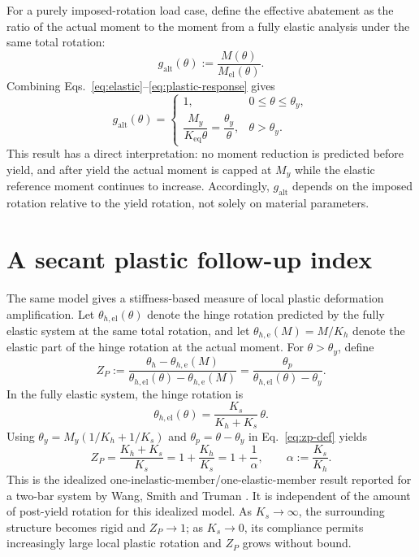 \documentclass[11pt,a4paper]{article}
\begin{document}
For a purely imposed-rotation load case, define the effective abatement as the ratio of the actual moment to the moment from a fully elastic analysis under the same total rotation:
\begin{equation}
g_{\mathrm{alt}}(\theta):=\frac{M(\theta)}{M_{\mathrm{el}}(\theta)}.
\label{eq:g-alt-def}
\end{equation}
Combining Eqs.~\eqref{eq:elastic}--\eqref{eq:plastic-response} gives
\begin{equation}
g_{\mathrm{alt}}(\theta)=
\begin{cases}
1, & 0\leq\theta\leq\theta_y,\\[2mm]
\dfrac{M_y}{K_{\mathrm{eq}}\theta}
=\dfrac{\theta_y}{\theta}, & \theta>\theta_y.
\end{cases}
\label{eq:g-alt}
\end{equation}
This result has a direct interpretation: no moment reduction is predicted before yield, and after yield the actual moment is capped at $M_y$ while the elastic reference moment continues to increase. Accordingly, $g_{\mathrm{alt}}$ depends on the imposed rotation relative to the yield rotation, not solely on material parameters.

\section{A secant plastic follow-up index}

The same model gives a stiffness-based measure of local plastic deformation amplification. Let $\theta_{h,\mathrm{el}}(\theta)$ denote the hinge rotation predicted by the fully elastic system at the same total rotation, and let $\theta_{h,\mathrm{e}}(M)=M/K_h$ denote the elastic part of the hinge rotation at the actual moment. For $\theta>\theta_y$, define
\begin{equation}
Z_P:=
\frac{\theta_h-\theta_{h,\mathrm{e}}(M)}
{\theta_{h,\mathrm{el}}(\theta)-\theta_{h,\mathrm{e}}(M)}
=\frac{\theta_p}
{\theta_{h,\mathrm{el}}(\theta)-\theta_y}.
\label{eq:zp-def}
\end{equation}
In the fully elastic system, the hinge rotation is
\begin{equation}
\theta_{h,\mathrm{el}}(\theta)
=\frac{K_s}{K_h+K_s}\,\theta.
\end{equation}
Using $\theta_y=M_y(1/K_h+1/K_s)$ and $\theta_p=\theta-\theta_y$ in Eq.~\eqref{eq:zp-def} yields
\begin{equation}
Z_P=\frac{K_h+K_s}{K_s}
=1+\frac{K_h}{K_s}
=1+\frac{1}{\alpha},
\qquad \alpha:=\frac{K_s}{K_h}.
\label{eq:zp}
\end{equation}
This is the idealized one-inelastic-member/one-elastic-member result reported for a two-bar system by Wang, Smith and Truman \cite{Wang2013}. It is independent of the amount of post-yield rotation for this idealized model. As $K_s\to\infty$, the surrounding structure becomes rigid and $Z_P\to1$; as $K_s\to0$, its compliance permits increasingly large local plastic rotation and $Z_P$ grows without bound.
\end{document}
